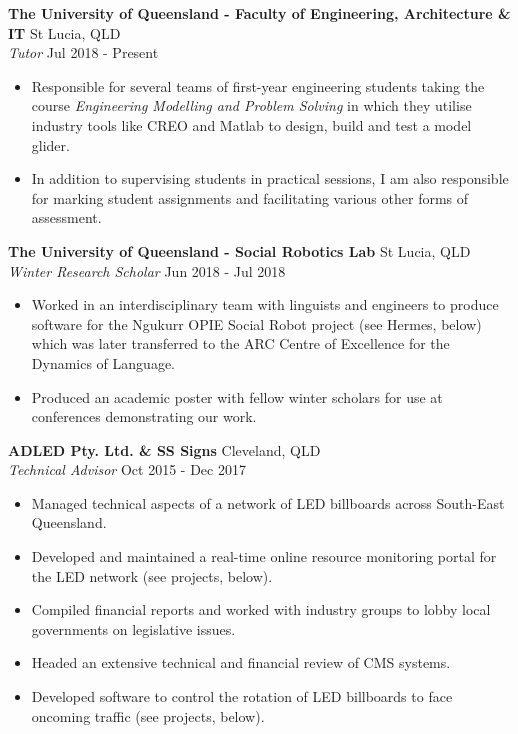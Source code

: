 \documentclass[a4paper]{article}
\newenvironment{myitemize}
{   \small
    \vspace{-2pt}
    \begin{itemize}
    \setlength{\itemsep}{0pt}
    \setlength{\parskip}{0pt}
    \setlength{\parsep}{0pt}     }
{ \end{itemize}                  }
\begin{document}
\textbf{The University of Queensland - Faculty of Engineering, Architecture \& IT} \hfill St Lucia, QLD\\
\textit{Tutor} \hfill Jul 2018 - Present\\
\begin{myitemize} \itemsep 0.75mm
	\item Responsible for several teams of first-year engineering students taking the course \textit{Engineering Modelling and Problem Solving} in which they utilise industry tools like CREO and Matlab to design, build and test a model glider.
	\item In addition to supervising students in practical sessions, I am also responsible for marking student assignments and facilitating various other forms of assessment.
\end{myitemize}
\vspace{-1mm}
\textbf{The University of Queensland - Social Robotics Lab} \hfill St Lucia, QLD\\
\textit{Winter Research Scholar} \hfill Jun 2018 - Jul 2018\\
\begin{myitemize} \itemsep 0.75mm
	\item Worked in an interdisciplinary team with linguists and engineers to produce software for the Ngukurr OPIE Social Robot project (see Hermes, below) which was later transferred to the ARC Centre of Excellence for the Dynamics of Language.
	\item Produced an academic poster with fellow winter scholars for use at conferences demonstrating our work.
\end{myitemize}
\vspace{-1mm}
\textbf{ADLED Pty. Ltd. \& SS Signs} \hfill Cleveland, QLD\\
\textit{Technical Advisor} \hfill Oct 2015 - Dec 2017\\
\begin{myitemize} \itemsep 0.75mm
	\item Managed technical aspects of a network of LED billboards across South-East Queensland.
	\item Developed and maintained a real-time online resource monitoring portal for the LED network (see projects, below).
	\item Compiled financial reports and worked with industry groups to lobby local governments on legislative issues.
	\item Headed an extensive technical and financial review of CMS systems.
	\item Developed software to control the rotation of LED billboards to face oncoming traffic (see projects, below).
\end{myitemize}
\end{document}
